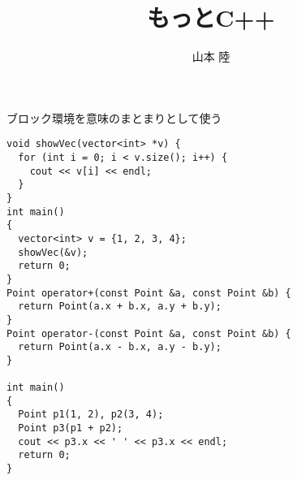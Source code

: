 \documentclass[dvipdfmx,12pt]{beamer}%
\title{もっとC++}
\author{山本 陸}
\begin{document}
\frame{\maketitle}

\begin{frame}[fragile]{ブロック環境を意味のまとまりとして使う}
  \begin{lstlisting}
void showVec(vector<int> *v) {
  for (int i = 0; i < v.size(); i++) {
    cout << v[i] << endl;
  }
}
int main()
{
  vector<int> v = {1, 2, 3, 4};
  showVec(&v);
  return 0;
}
Point operator+(const Point &a, const Point &b) {
  return Point(a.x + b.x, a.y + b.y);
}
Point operator-(const Point &a, const Point &b) {
  return Point(a.x - b.x, a.y - b.y);
}

int main()
{
  Point p1(1, 2), p2(3, 4);
  Point p3(p1 + p2);
  cout << p3.x << ' ' << p3.x << endl;
  return 0;
}
  \end{lstlisting}
\end{frame}

\end{document}
